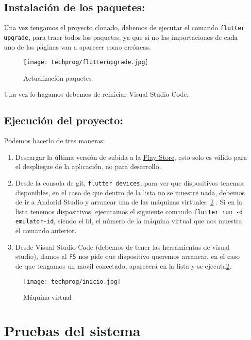 \subsection{Instalación de los paquetes:}
Una vez tengamos el proyecto clonado, debemos de ejecutar el comando \texttt{flutter upgrade}, para traer todos los paquetes, ya que si no las importaciones de cada uno de las páginas van a aparecer como erróneas.

\begin{figure}[H]
	\centering
	\texttt{[image: techprog/flutterupgrade.jpg]}
	\caption{Actualización paquetes}\label{fig:upgrade}
\end{figure}

Una vez lo hagamos debemos de reiniciar Visual Studio Code.

\subsection{Ejecución del proyecto:}
Podemos hacerlo de tres maneras:
\begin{enumerate}
	\item Descargar la última versión de subida a la \href{https://play.google.com/store/apps/details?id=com.ubu.flutter_snake}{Play Store}, esto solo es válido para el despliegue de la aplicación, no para desarrollo.
	\item Desde la consola de git, \texttt{flutter devices}, para ver que dispositivos tenemos disponibles, en el caso de que dentro de la lista no se muestre nada, debemos de ir a Andorid Studio y arrancar una de las máquinas virtuales~\ref{fig:run} .
	Si en la lista tenemos dispositivos, ejecutamos el siguiente comando \texttt{flutter run -d emulator-id}, siendo el id, el número de la máquina virtual que nos muestra el comando anterior.
	\item Desde Visual Studio Code (debemos de tener las herramientas de visual studio), damos al \texttt{F5} nos pide que dispositivo queremos arrancar, en el caso de que tengamos un movil conectado, aparecerá en la lista y se ejecuta\ref{fig:run}.
\end{enumerate} 	

\begin{figure}[H]
	\centering
	\texttt{[image: techprog/inicio.jpg]}
	\caption{Máquina virtual}\label{fig:run}
\end{figure}

\section{Pruebas del sistema}
